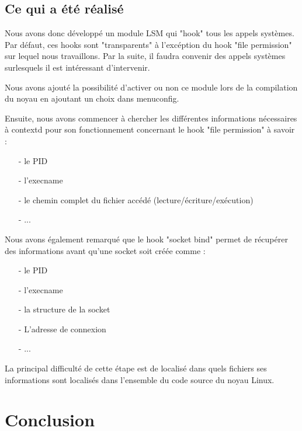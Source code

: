 \documentclass[pdftex,a4paper,titlepage,11pt,openright]{article}
\newcommand{\clearemptydoublepage}{
	\newpage{\pagestyle{empty}\cleardoublepage}}
\begin{document}
\newpage

\subsection{Ce qui a été réalisé}

Nous avons donc développé un module LSM qui "hook" tous les appels systèmes. Par défaut, ces hooks sont "transparents" à l'excéption du hook "file permission" sur lequel nous travaillons. Par la suite, il faudra convenir des appels systèmes surlesquels il est intéressant d'intervenir.

Nous avons ajouté la possibilité d'activer ou non ce module lors de la compilation du noyau en ajoutant un choix dans menuconfig.

Ensuite, nous avons commencer à chercher les différentes informations nécessaires à contextd pour son fonctionnement concernant le hook "file permission" à savoir :
	\begin{itemize}
		\item[-] le PID
		\item[-] l'execname
		\item[-] le chemin complet du fichier accédé (lecture/écriture/exécution)
		\item[-] ...
	\end{itemize}

Nous avons également remarqué que le hook "socket bind" permet de récupérer des informations avant qu'une socket soit créée comme :
	\begin{itemize}
		\item[-] le PID
		\item[-] l'execname
		\item[-] la structure de la socket
		\item[-] L'adresse de connexion
		\item[-] ...
	\end{itemize}

La principal difficulté de cette étape est de localisé dans quels fichiers ses informations sont localisés dans l'ensemble du code source du noyau Linux.



\newpage

\clearemptydoublepage

\section*{Conclusion} 
\end{document}
